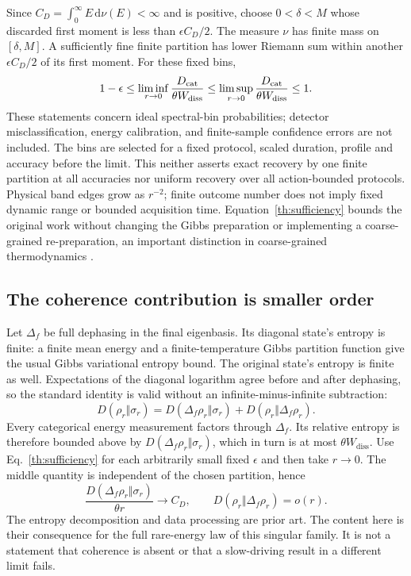 \documentclass[aps,prl,reprint,superscriptaddress,longbibliography]{revtex4-2}
\newcommand{\Wd}{W_{\mathrm{diss}}}
\newcommand{\dd}{\mathrm{d}}
\begin{document}
Since $C_D=\int_0^\infty E\,\dd\nu(E)<\infty$ and is positive, choose $0<\delta<M$ whose discarded first moment is less than $\epsilon C_D/2$. The measure $\nu$ has finite mass on $[\delta,M]$. A sufficiently fine finite partition has lower Riemann sum within another $\epsilon C_D/2$ of its first moment. For these fixed bins,
\begin{equation}
 1-\epsilon\le\liminf_{r\to0}\frac{D_{\rm cat}}{\theta\Wd}
 \le\limsup_{r\to0}\frac{D_{\rm cat}}{\theta\Wd}\le1.
 \label{th:sufficiency}
\end{equation}
These statements concern ideal spectral-bin probabilities; detector misclassification, energy calibration, and finite-sample confidence errors are not included. The bins are selected for a fixed protocol, scaled duration, profile and accuracy before the limit. This neither asserts exact recovery by one finite partition at all accuracies nor uniform recovery over all action-bounded protocols. Physical band edges grow as $r^{-2}$; finite outcome number does not imply fixed dynamic range or bounded acquisition time. Equation~\eqref{th:sufficiency} bounds the original work without changing the Gibbs preparation or implementing a coarse-grained re-preparation, an important distinction in coarse-grained thermodynamics \cite{Rubino}.

\subsection{The coherence contribution is smaller order}

Let $\Delta_f$ be full dephasing in the final eigenbasis. Its diagonal state's entropy is finite: a finite mean energy and a finite-temperature Gibbs partition function give the usual Gibbs variational entropy bound. The original state's entropy is finite as well. Expectations of the diagonal logarithm agree before and after dephasing, so the standard identity \cite{Francica} is valid without an infinite-minus-infinite subtraction:
\begin{equation}
 D(\rho_r\Vert\sigma_r)=D(\Delta_f\rho_r\Vert\sigma_r)
 +D(\rho_r\Vert\Delta_f\rho_r).\label{th:split}
\end{equation}
Every categorical energy measurement factors through $\Delta_f$. Its relative entropy is therefore bounded above by $D(\Delta_f\rho_r\Vert\sigma_r)$, which in turn is at most $\theta\Wd$. Use Eq.~\eqref{th:sufficiency} for each arbitrarily small fixed $\epsilon$ and then take $r\to0$. The middle quantity is independent of the chosen partition, hence
\begin{equation}
 \frac{D(\Delta_f\rho_r\Vert\sigma_r)}{\theta r}\to C_D,
 \qquad D(\rho_r\Vert\Delta_f\rho_r)=o(r).
 \label{th:coherenceresult}
\end{equation}
The entropy decomposition and data processing are prior art. The content here is their consequence for the full rare-energy law of this singular family. It is not a statement that coherence is absent or that a slow-driving result in a different limit fails.
\end{document}
